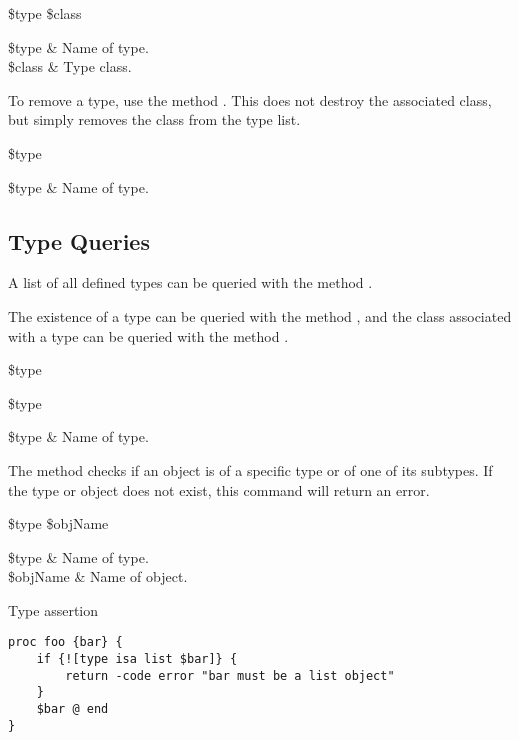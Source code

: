 \documentclass{article}
\begin{document}
\begin{syntax}
 \$type \$class
\end{syntax}
\begin{args}
\$type & Name of type. \\
\$class & Type class.
\end{args}

To remove a type, use the method . 
This does not destroy the associated class, but simply removes the class from the type list. 
\begin{syntax}
 \$type
\end{syntax}
\begin{args}
\$type & Name of type. 
\end{args}

\clearpage
\subsection{Type Queries}
A list of all defined types can be queried with the method . 
\begin{syntax}
\end{syntax}

The existence of a type can be queried with the method , and 
the class associated with a type can be queried with the method . 
\begin{syntax}
 \$type
\end{syntax}
\begin{syntax}
 \$type
\end{syntax}
\begin{args}
\$type & Name of type. 
\end{args}

The method  checks if an object is of a specific type or of one of its subtypes.
If the type or object does not exist, this command will return an error.

\begin{syntax}
 \$type \$objName
\end{syntax}
\begin{args}
\$type & Name of type. \\
\$objName & Name of object.
\end{args}

\begin{example}{Type assertion}
\begin{lstlisting}
proc foo {bar} {
    if {![type isa list $bar]} {
        return -code error "bar must be a list object" 
    }
    $bar @ end
}
\end{lstlisting}
\end{example}
\end{document}
